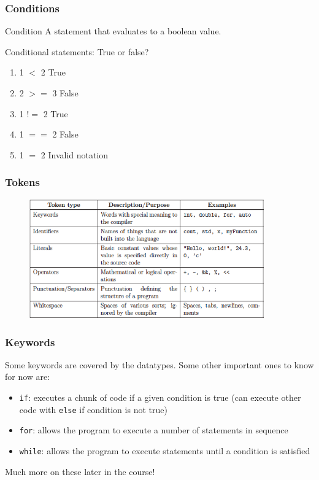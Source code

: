 \documentclass{if-beamer}
\begin{document}
\begin{frame}
\frametitle{Conditions}
\begin{block}{Condition}
	A statement that evaluates to a boolean value. 
\end{block}
\begin{block}{Conditional statements: True or false?}
	\begin{enumerate}
		\item 1 $<$ 2  \hfill  True \\
		\item 2 $>=$ 3  \hfill False \\
		\item 1 $!=$ 2  \hfill True \\
		\item 1 $==$ 2  \hfill False \\
		\item 1 $=$ 2  \hfill Invalid notation \\
	\end{enumerate}
\end{block}
\end{frame}


\begin{frame}
\frametitle{Tokens}
\begin{figure}
	\center
	\includegraphics[width=0.9\textwidth]{tokens.png}
\end{figure}
\end{frame}

\begin{frame}
\frametitle{Keywords}
Some keywords are covered by the datatypes. Some other important
ones to know for now are:
\begin{itemize}
\item \texttt{if}: executes a chunk of code if a given condition is
true (can execute other code with \texttt{else} if condition
is not true)
\item \texttt{for}: allows the program to execute a number of
statements in sequence
\item \texttt{while}: allows the program to execute statements
until a condition is satisfied
\end{itemize}
Much more on these later in the course!
\end{frame}
\end{document}
